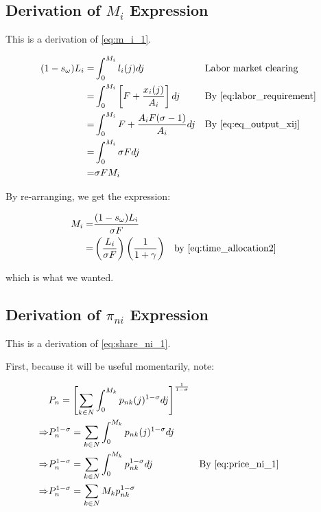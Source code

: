 \documentclass[10pt]{article}
\begin{document}
\subsection{Derivation of $M_i$ Expression}
\label{sec:m_i_1}

This is a derivation of \eqref{eq:m_i_1}.

\begin{align}
    (1-s_\omega) L_i = &\int_{0}^{M_i} l_i(j) dj && \parbox[t]{4cm}{\raggedright Labor market clearing}\\
    = & \int_{0}^{M_i} \left[F + \frac{x_i(j)}{A_i}\right] dj && \text{By \eqref{eq:labor_requirement}} \\
    = &\int_{0}^{M_i} F + \frac{A_i F (\sigma -1)}{A_i} dj && \text{By \eqref{eq:eq_output_xij}} \\
    = &\int_{0}^{M_i} \sigma F dj \\
    = & \sigma F M_i
\end{align}

By re-arranging, we get the expression:

\begin{align}
    M_i = &\frac{(1-s_\omega)L_i}{\sigma F} \\
    = &\left(\frac{L_i}{\sigma F}\right) \left(\frac{1}{1+\gamma}\right) && \text{by \eqref{eq:time_allocation2}}
\end{align}

which is what we wanted. 



\subsection{Derivation of $\pi_{n i}$ Expression}
\label{sec:share_ni_1}

This is a derivation of \eqref{eq:share_ni_1}.

First, because it will be useful momentarily, note:

\begin{align}
    &P_n=\left[\sum_{k \in N} \int_0^{M_k} p_{n k}(j)^{1-\sigma} d j\right]^{\frac{1}{1-\sigma}} \\
    \Rightarrow &P_n^{1-\sigma} = \sum_{k \in N} \int_0^{M_k} p_{n k}(j)^{1-\sigma} d j \\
    \Rightarrow &P_n^{1-\sigma} = \sum_{k \in N} \int_0^{M_k} p_{nk}^{1-\sigma} d j && \parbox[t]{4cm}{\raggedright By \eqref{eq:price_ni_1}} \\
    \Rightarrow &P_n^{1-\sigma} = \sum_{k \in N} M_k p_{nk}^{1-\sigma} \label{eq:price_ind_interm_share_ni_1}
\end{align}
\end{document}
